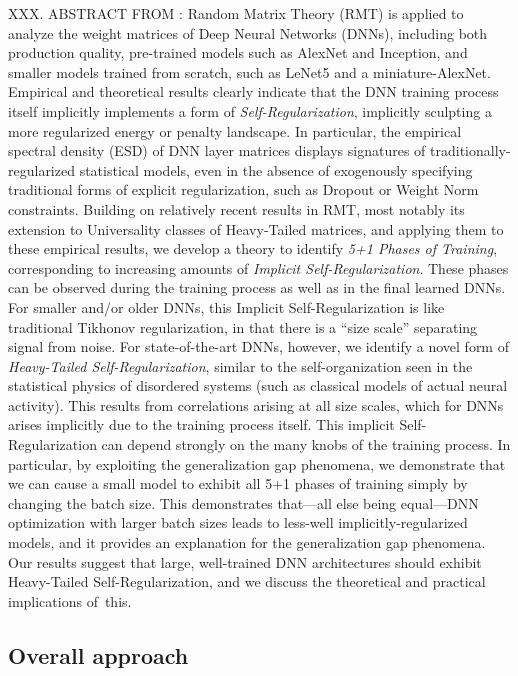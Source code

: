 \documentclass{article}
\begin{document}
XXX.  ABSTRACT FROM \cite{MM18_TR}:
Random Matrix Theory (RMT) is applied to analyze the weight matrices of Deep Neural Networks (DNNs), including both production quality, pre-trained models such as AlexNet and Inception, and smaller models trained from scratch, such as LeNet5 and a miniature-AlexNet.
Empirical and theoretical results clearly indicate that the DNN training process itself implicitly implements a form of \emph{Self-Regularization}, implicitly sculpting a more regularized energy or penalty landscape.
In particular, the empirical spectral density (ESD) of DNN layer matrices displays signatures of traditionally-regularized statistical models, even in the absence of exogenously specifying traditional forms of explicit regularization, such as Dropout or Weight Norm constraints.
Building on relatively recent results in RMT, most notably its extension to Universality classes of Heavy-Tailed matrices, and applying them to these empirical results,
we develop a theory to identify \emph{5+1 Phases of Training}, corresponding to increasing amounts of \emph{Implicit Self-Regularization}.
These phases can be observed during the training process as well as in the final learned DNNs.
For smaller and/or older DNNs, this Implicit Self-Regularization is like traditional Tikhonov regularization, in that there is a ``size scale'' separating signal from noise.
For state-of-the-art DNNs, however, we identify a novel form of \emph{Heavy-Tailed Self-Regularization}, similar to the self-organization seen in the statistical physics of disordered systems (such as classical models of actual neural activity).
This results from correlations arising at all size scales, which for DNNs arises implicitly due to the training process itself.
This implicit Self-Regularization can depend strongly on the many knobs of the training process.
In particular, by exploiting the generalization gap phenomena,
we demonstrate that we can cause a small model to exhibit all 5+1 phases of training simply by changing the batch size.
This demonstrates that---all else being equal---DNN optimization with larger batch sizes leads to less-well implicitly-regularized models, and it provides an explanation for the generalization gap phenomena.
Our results suggest that large, well-trained DNN architectures should exhibit Heavy-Tailed Self-Regularization, and we discuss the theoretical and practical implications of~this.


\subsection{Overall approach}
\label{sxn:approach}
\end{document}

